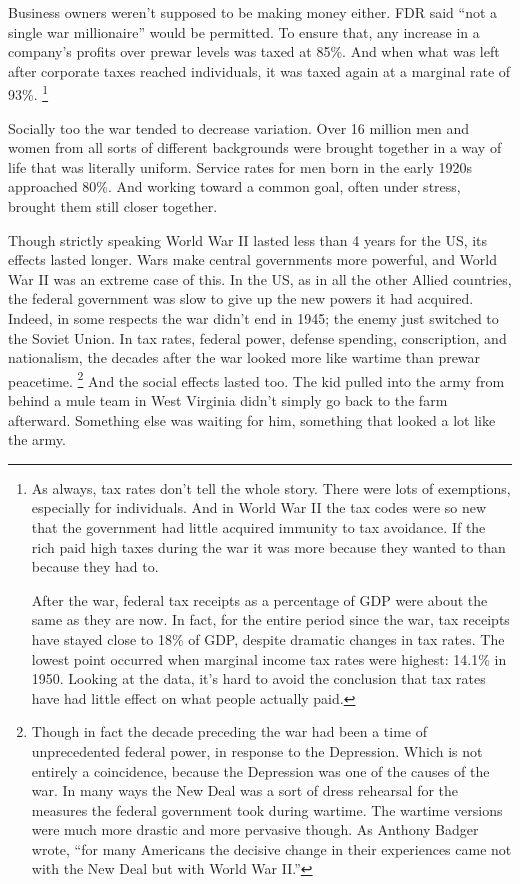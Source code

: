 Business owners weren't supposed to be making money either. FDR said
``not a single war millionaire'' would be permitted. To ensure that, any
increase in a company's profits over prewar levels was taxed at 85\%.
And when what was left after corporate taxes reached individuals, it was
taxed again at a marginal rate of 93\%. \footnote{As always, tax rates don't tell the whole story. There were lots
of exemptions, especially for individuals. And in World War II the tax
codes were so new that the government had little acquired immunity to
tax avoidance. If the rich paid high taxes during the war it was more
because they wanted to than because they had to.

After the war, federal tax receipts as a percentage of GDP were about
the same as they are now. In fact, for the entire period since the war,
tax receipts have stayed close to 18\% of GDP, despite dramatic changes
in tax rates. The lowest point occurred when marginal income tax rates
were highest: 14.1\% in 1950. Looking at the data, it's hard to avoid
the conclusion that tax rates have had little effect on what people
actually paid.}

Socially too the war tended to decrease variation. Over 16 million men
and women from all sorts of different backgrounds were brought together
in a way of life that was literally uniform. Service rates for men born
in the early 1920s approached 80\%. And working toward a common goal,
often under stress, brought them still closer together.

Though strictly speaking World War II lasted less than 4 years for the
US, its effects lasted longer. Wars make central governments more
powerful, and World War II was an extreme case of this. In the US, as in
all the other Allied countries, the federal government was slow to give
up the new powers it had acquired. Indeed, in some respects the war
didn't end in 1945; the enemy just switched to the Soviet Union. In tax
rates, federal power, defense spending, conscription, and nationalism,
the decades after the war looked more like wartime than prewar
peacetime. \footnote{Though in fact the decade preceding the war had been a time of
unprecedented federal power, in response to the Depression. Which is not
entirely a coincidence, because the Depression was one of the causes of
the war. In many ways the New Deal was a sort of dress rehearsal for the
measures the federal government took during wartime. The wartime
versions were much more drastic and more pervasive though. As Anthony
Badger wrote, ``for many Americans the decisive change in their
experiences came not with the New Deal but with World War II.''} And the social effects lasted too.
The kid pulled into the army from behind a mule team in West Virginia
didn't simply go back to the farm afterward. Something else was waiting
for him, something that looked a lot like the army.

